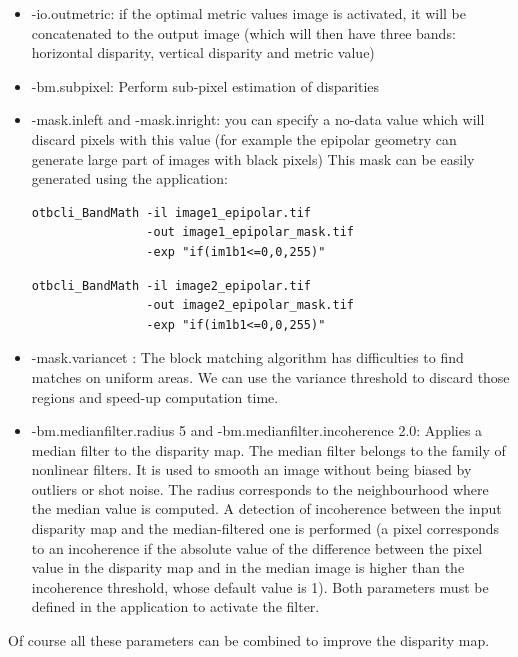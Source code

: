 \begin{itemize}
\item -io.outmetric: if the optimal metric values image is
  activated, it will be concatenated to the output image (which will then
  have three bands: horizontal disparity, vertical disparity and metric value)
\item -bm.subpixel: Perform sub-pixel estimation of disparities
\item -mask.inleft and -mask.inright: you can specify a no-data value which
  will discard pixels with this value (for example the epipolar geometry can
  generate large part of images with black pixels)
  This mask can be easily generated using the  application:

\begin{verbatim}
otbcli_BandMath -il image1_epipolar.tif
                -out image1_epipolar_mask.tif
                -exp "if(im1b1<=0,0,255)"
\end{verbatim}

\begin{verbatim}
otbcli_BandMath -il image2_epipolar.tif
                -out image2_epipolar_mask.tif
                -exp "if(im1b1<=0,0,255)"
\end{verbatim}

\item -mask.variancet : The block matching algorithm has difficulties to find
  matches on uniform areas. We can use the variance threshold to discard those
  regions and speed-up computation time.
\item -bm.medianfilter.radius 5 and -bm.medianfilter.incoherence 2.0: Applies a
  median filter to the disparity map. The median filter belongs to the family of
  nonlinear filters. It is used to smooth an image without being biased by
  outliers or shot noise. The radius corresponds to the neighbourhood where the
  median value is computed. A detection of incoherence between the input
  disparity map and the median-filtered one is performed (a pixel corresponds to an
  incoherence if the absolute value of the difference between the pixel value in
  the disparity map and in the median image is higher than the incoherence
  threshold, whose default value is 1). Both parameters must be defined in the
  application to activate the filter.
\end{itemize}

Of course all these parameters can be combined to improve the disparity map.

